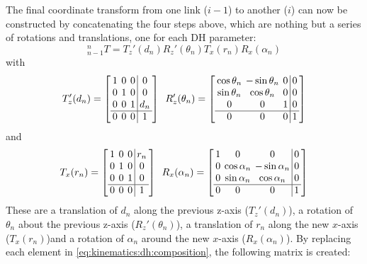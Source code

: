 The final coordinate transform from one link ($i-1$) to another ($i$) can now be constructed by concatenating the four steps above, which are nothing but a series of rotations and translations, one for each DH parameter:
%
\begin{equation}\label{eq:kinematics:dh:composition}
_{n-1}^nT=T_z'(d_n) R_z'(\theta_n) T_x(r_n)  R_x(\alpha_n)
\end{equation}
with
\begin{equation}
T_z'(d_n)=
\left[ \arraycolsep=2pt%
\begin{array}{ccc|c}
1 & 0 & 0 & 0\\
0 & 1 & 0 & 0\\
0 & 0 & 1 & d_n\\
\hline
0 & 0 & 0 & 1
\end{array}
\right]
\enskip
R_z'(\theta_n)=\left[ \arraycolsep=2pt%
\begin{array}{ccc|c}
\cos\theta_n & -\sin\theta_n & 0 & 0\\
\sin\theta_n & \cos\theta_n & 0 & 0\\
0 & 0 & 1 & 0\\
\hline
0 & 0 & 0 & 1
\end{array}
\right]
\end{equation}
and
\begin{equation}
T_x(r_n)=
\left[ \arraycolsep=2pt%
\begin{array}{ccc|c}
1 & 0 & 0 & r_n\\
0 & 1 & 0 & 0\\
0 & 0 & 1 & 0\\
\hline
0 & 0 & 0 & 1
\end{array}
\right]
\enskip
R_x(\alpha_n)=\left[ \arraycolsep=2pt%
\begin{array}{ccc|c}
1 & 0 & 0 & 0\\
0 & \cos\alpha_n & -\sin\alpha_n & 0\\
0 & \sin\alpha_n & \cos\alpha_n & 0\\
\hline
0 & 0 & 0 & 1
\end{array}
\right]
\end{equation}
%
These are a translation of $d_n$ along the previous z-axis ($T_z'(d_n)$), a rotation of $\theta_n$ about the previous z-axis ($R_z'(\theta_n)$), a translation of $r_n$ along the new $x$-axis ($T_x(r_n)$)and a rotation of $\alpha_n$ around the new $x$-axis ($R_x(\alpha_n)$).
%
By replacing each element in \cref{eq:kinematics:dh:composition}, the following matrix is created:
